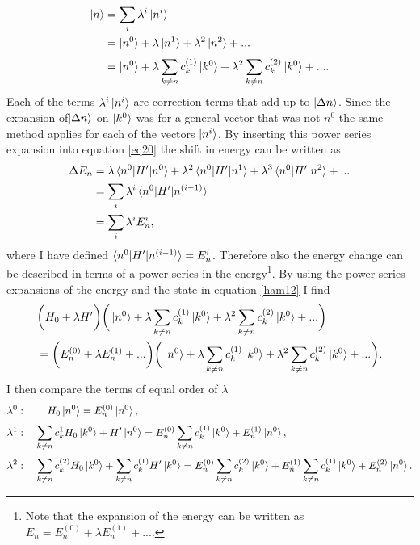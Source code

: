 \begin{equation}
	\begin{split}
		\ket{n}&=\sum_{i}\lambda^i\ket{n^i}\\
		&=\ket{n^0}+\lambda\ket{n^1}+\lambda^2\ket{n^2}+...\\
		&=\ket{n^0}+\lambda\sum_{k\neq n}^{}c_k^{(1)}\ket{k^0}+\lambda^2\sum_{k\neq n}^{}c_k^{(2)}\ket{k^0}+....
		\label{eig4}
	\end{split}
\end{equation} 
Each of the terms $\lambda^i\ket{n^i}$ are correction terms that add up to $\ket{\Delta n}$. Since the expansion of$\ket{\Delta n}$ on $\ket{k^0}$ was for a general vector that was not $n^0$ the same method applies for each of the vectors $\ket{n^i}$. 
By inserting this power series expansion into equation \eqref{eq20} the shift in energy can be written as
\begin{equation}
	\begin{split}
		\Delta E_n&=\lambda\braket{n^0|H'|n^0}+\lambda^2\braket{n^0|H'|n^1}+\lambda^3\braket{n^0|H'|n^2}+...\\
		&=\sum_{i}\lambda^i\braket{n^0|H'|n^{(i-1)}}\\
		&=\sum_{i}\lambda^iE_n^i,
	\end{split}
	\label{eq21}
\end{equation} 
where I have defined $\braket{n^0|H'|n^{(i-1)}}=E_n^i$. Therefore also the energy change can be described in terms of a power series in the energy\footnote{Note that the expansion of the energy can be written as $E_n=E_n^{(0)}+\lambda E_n^{(1)}+...$.}. By using the power series expansions of the energy and the state in equation \eqref{ham12} I find
\begin{equation}
	\begin{split}
		&\bigg(H_0+\lambda H'\bigg)\bigg(\ket{n^0}+\lambda\sum_{k\neq n}^{}c_k^{(1)}\ket{k^0}+\lambda^2\sum_{k\neq n}^{}c_k^{(2)}\ket{k^0}+...\bigg)\\&=\bigg(E_n^{(0)}+\lambda E_n^{(1)}+...\bigg)\bigg(\ket{n^0}+\lambda\sum_{k\neq n}^{}c_k^{(1)}\ket{k^0}+\lambda^2\sum_{k\neq n}^{}c_k^{(2)}\ket{k^0}+...\bigg).
	\end{split}
\end{equation} 
I then compare the terms of equal order of $\lambda$
\begin{equation}
	\begin{split}
		&\lambda^0:\qquad H_0\ket{n^0}=E_n^{(0)}\ket{n^0},\\
		&\lambda^1:\quad \sum_{k\neq n}^{}c_k^1H_0\ket{k^0}+H'\ket{n^0}=E_n^{(0)}\sum_{k\neq n}^{}c_k^{(1)}\ket{k^0}+E_n^{(1)}\ket{n^0},\\
		&\lambda^2:\quad \sum_{k\neq n}^{}c_k^{(2)}H_0\ket{k^0}+\sum_{k\neq n}^{}c_k^{(1)}H'\ket{k^0}=E_n^{(0)}\sum_{k\neq n}^{}c_k^{(2)}\ket{k^0}+E_n^{(1)}\sum_{k\neq n}^{}c_k^{(1)}\ket{k^0}+E_n^{(2)}\ket{n^0}.
	\end{split}
	\label{eq22}
\end{equation} 
